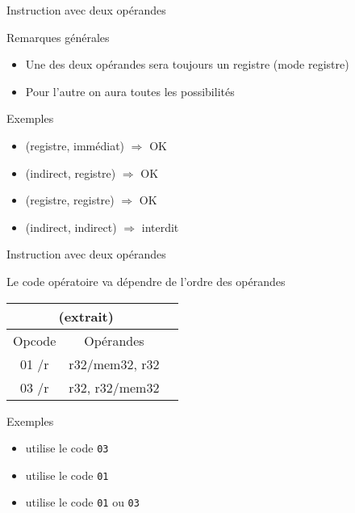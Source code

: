 \documentclass[14pt,xcolor,table]{beamer}
\begin{document}
\begin{frame}[fragile]{Instruction avec deux opérandes}

	Remarques générales
	\begin{itemize}
	\item Une des deux opérandes sera toujours un registre (mode registre)
	\item Pour l'autre on aura toutes les possibilités
	\end{itemize}
	
	\bigskip
	Exemples
	\begin{itemize}
	\item {} (registre, immédiat) $\Rightarrow$ OK
	\item {} (indirect, registre) $\Rightarrow$ OK
	\item {} (registre, registre) $\Rightarrow$ OK
	\item {} (indirect, indirect)  $\Rightarrow$ interdit
	\end{itemize}
	
\end{frame}

\begin{frame}[fragile]{Instruction avec deux opérandes}

	Le code opératoire va dépendre de l'ordre des opérandes
	\begin{center}
	\begin{small}
	\begin{tabular}{|c|c|c|}
	\multicolumn{2}{c}{\asm{ADD} (extrait)}\\\hline
	{\cellcolor{gray!25}Opcode} & {\cellcolor{gray!25}Opérandes} \\\hline
	01 /r & r32/mem32, r32 \\\hline
	03 /r & r32, r32/mem32 \\\hline
	\end{tabular}
	\end{small}
	\end{center}
	
	\bigskip
	Exemples
	\begin{itemize}
	\item {} utilise le code \verb_03_
	\item {} utilise le code \verb_01_
	\item {} utilise le code \verb_01_ ou \verb_03_
	\end{itemize}
	
\end{frame}
\end{document}
